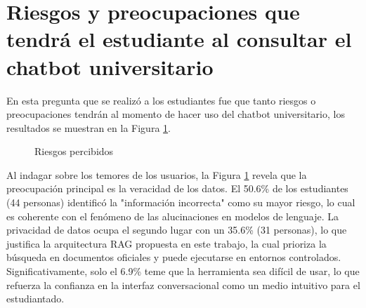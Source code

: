 {{\section{Riesgos y preocupaciones que tendrá el estudiante al consultar el chatbot universitario}
En esta pregunta que se realizó a los estudiantes fue que tanto riesgos o preocupaciones tendrán al momento de hacer uso del chatbot universitario, los resultados se muestran en la Figura \ref{fig:riesgos_percibidos}.

\begin{figure}[H]
    \centering
    \caption{Riesgos percibidos}
    \label{fig:riesgos_percibidos}
\end{figure} 

Al indagar sobre los temores de los usuarios, la Figura \ref{fig:riesgos_percibidos} revela que la preocupación principal es la veracidad de los datos. El 50.6\% de los estudiantes (44 personas) identificó la "información incorrecta" como su mayor riesgo, lo cual es coherente con el fenómeno de las alucinaciones en modelos de lenguaje. La privacidad de datos ocupa el segundo lugar con un 35.6\% (31 personas), lo que justifica la arquitectura RAG propuesta en este trabajo, la cual prioriza la búsqueda en documentos oficiales y puede ejecutarse en entornos controlados. Significativamente, solo el 6.9\% teme que la herramienta sea difícil de usar, lo que refuerza la confianza en la interfaz conversacional como un medio intuitivo para el estudiantado.
}}
